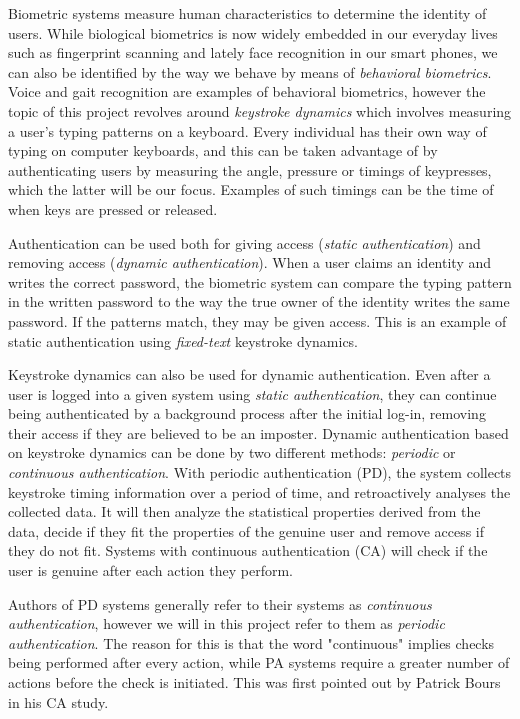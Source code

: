 \documentclass[informationsecurity]{gucmasterproject}
\begin{document}
Biometric systems measure human characteristics to determine the identity of users.
While biological biometrics is now widely embedded in our everyday lives such as fingerprint scanning and lately face recognition in our smart phones, we can also be identified by the way we behave by means of \textit{behavioral biometrics}.
Voice and gait recognition are examples of behavioral biometrics, however the topic of this project revolves around \textit{keystroke dynamics} which involves measuring a user's typing patterns on a keyboard.
Every individual has their own way of typing on computer keyboards, and this can be taken advantage of by authenticating users by measuring the angle, pressure or timings of keypresses, which the latter will be our focus.
Examples of such timings can be the time of when keys are pressed or released. 

Authentication can be used both for giving access (\textit{static authentication}) and removing access (\textit{dynamic authentication}).
When a user claims an identity and writes the correct password, the biometric system can compare the typing pattern in the written password to the way the true owner of the identity writes the same password.
If the patterns match, they may be given access.
This is an example of static authentication using \textit{fixed-text} keystroke dynamics.

Keystroke dynamics can also be used for dynamic authentication.
Even after a user is logged into a given system using \textit{static authentication}, they can continue being authenticated by a background process after the initial log-in, removing their access if they are believed to be an imposter.
Dynamic authentication based on keystroke dynamics can be done by two different methods: \textit{periodic} or \textit{continuous authentication}.
With periodic authentication (PD), the system collects keystroke timing information over a period of time, and retroactively analyses the collected data.
It will then analyze the statistical properties derived from the data, decide if they fit the properties of the genuine user and remove access if they do not fit.
Systems with continuous authentication (CA) will check if the user is genuine after each action they perform.

Authors of PD systems generally refer to their systems as \textit{continuous authentication}, however we will in this project refer to them as \textit{periodic authentication}. 
The reason for this is that the word "continuous" implies checks being performed after every action, while PA systems require a greater number of actions before the check is initiated. 
This was first pointed out by Patrick Bours \cite{BOURS201236} in his CA study.
\end{document}
